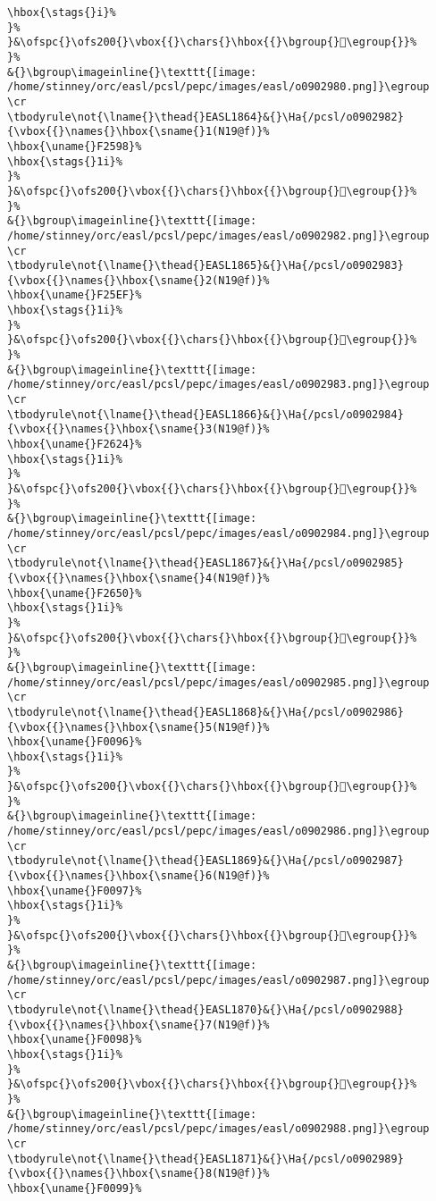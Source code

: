 \begin{verbatim}
\hbox{\stags{}i}%
}%
}&\ofspc{}\ofs200{}\vbox{{}\chars{}\hbox{{}\bgroup{}󰂕\egroup{}}%
}%
&{}\bgroup\imageinline{}\texttt{[image: /home/stinney/orc/easl/pcsl/pepc/images/easl/o0902980.png]}\egroup
\cr
\tbodyrule\not{\lname{}\thead{}EASL1864}&{}\Ha{/pcsl/o0902982}{\vbox{{}\names{}\hbox{\sname{}1(N19@f)}%
\hbox{\uname{}F2598}%
\hbox{\stags{}1i}%
}%
}&\ofspc{}\ofs200{}\vbox{{}\chars{}\hbox{{}\bgroup{}󲖘\egroup{}}%
}%
&{}\bgroup\imageinline{}\texttt{[image: /home/stinney/orc/easl/pcsl/pepc/images/easl/o0902982.png]}\egroup
\cr
\tbodyrule\not{\lname{}\thead{}EASL1865}&{}\Ha{/pcsl/o0902983}{\vbox{{}\names{}\hbox{\sname{}2(N19@f)}%
\hbox{\uname{}F25EF}%
\hbox{\stags{}1i}%
}%
}&\ofspc{}\ofs200{}\vbox{{}\chars{}\hbox{{}\bgroup{}󲗯\egroup{}}%
}%
&{}\bgroup\imageinline{}\texttt{[image: /home/stinney/orc/easl/pcsl/pepc/images/easl/o0902983.png]}\egroup
\cr
\tbodyrule\not{\lname{}\thead{}EASL1866}&{}\Ha{/pcsl/o0902984}{\vbox{{}\names{}\hbox{\sname{}3(N19@f)}%
\hbox{\uname{}F2624}%
\hbox{\stags{}1i}%
}%
}&\ofspc{}\ofs200{}\vbox{{}\chars{}\hbox{{}\bgroup{}󲘤\egroup{}}%
}%
&{}\bgroup\imageinline{}\texttt{[image: /home/stinney/orc/easl/pcsl/pepc/images/easl/o0902984.png]}\egroup
\cr
\tbodyrule\not{\lname{}\thead{}EASL1867}&{}\Ha{/pcsl/o0902985}{\vbox{{}\names{}\hbox{\sname{}4(N19@f)}%
\hbox{\uname{}F2650}%
\hbox{\stags{}1i}%
}%
}&\ofspc{}\ofs200{}\vbox{{}\chars{}\hbox{{}\bgroup{}󲙐\egroup{}}%
}%
&{}\bgroup\imageinline{}\texttt{[image: /home/stinney/orc/easl/pcsl/pepc/images/easl/o0902985.png]}\egroup
\cr
\tbodyrule\not{\lname{}\thead{}EASL1868}&{}\Ha{/pcsl/o0902986}{\vbox{{}\names{}\hbox{\sname{}5(N19@f)}%
\hbox{\uname{}F0096}%
\hbox{\stags{}1i}%
}%
}&\ofspc{}\ofs200{}\vbox{{}\chars{}\hbox{{}\bgroup{}󰂖\egroup{}}%
}%
&{}\bgroup\imageinline{}\texttt{[image: /home/stinney/orc/easl/pcsl/pepc/images/easl/o0902986.png]}\egroup
\cr
\tbodyrule\not{\lname{}\thead{}EASL1869}&{}\Ha{/pcsl/o0902987}{\vbox{{}\names{}\hbox{\sname{}6(N19@f)}%
\hbox{\uname{}F0097}%
\hbox{\stags{}1i}%
}%
}&\ofspc{}\ofs200{}\vbox{{}\chars{}\hbox{{}\bgroup{}󰂗\egroup{}}%
}%
&{}\bgroup\imageinline{}\texttt{[image: /home/stinney/orc/easl/pcsl/pepc/images/easl/o0902987.png]}\egroup
\cr
\tbodyrule\not{\lname{}\thead{}EASL1870}&{}\Ha{/pcsl/o0902988}{\vbox{{}\names{}\hbox{\sname{}7(N19@f)}%
\hbox{\uname{}F0098}%
\hbox{\stags{}1i}%
}%
}&\ofspc{}\ofs200{}\vbox{{}\chars{}\hbox{{}\bgroup{}󰂘\egroup{}}%
}%
&{}\bgroup\imageinline{}\texttt{[image: /home/stinney/orc/easl/pcsl/pepc/images/easl/o0902988.png]}\egroup
\cr
\tbodyrule\not{\lname{}\thead{}EASL1871}&{}\Ha{/pcsl/o0902989}{\vbox{{}\names{}\hbox{\sname{}8(N19@f)}%
\hbox{\uname{}F0099}%

\end{verbatim}
